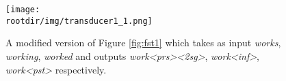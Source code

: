 \begin{figure}[!ht]
    \centering
    \texttt{[image: \\rootdir/img/transducer1\_1.png]}
    \caption{A modified version of Figure \ref{fig:fst1} which takes as input \textit{works}, \textit{working}, \textit{worked} and outputs \textit{work<prs><2sg>}, \textit{work<inf>}, \textit{work<pst>} respectively.}
    \label{fig:fst1_1}
\end{figure}
